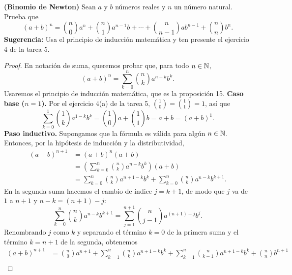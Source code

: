\documentclass[12pt,a4paper]{article}
\begin{document}
    \begin{problema}
        \textbf{(Binomio de Newton)} Sean $a$ y $b$ números reales y $n$ un número natural. Prueba que
        \begin{equation*}
            (a+b)^{n}=\binom{n}{0}a^{n}+\binom{n}{1}a^{n-1}b+\cdots+\binom{n}{n-1}ab^{n-1}+\binom{n}{n}b^{n}.
        \end{equation*}
        \textbf{Sugerencia:} Usa el principio de inducción matemática y ten presente el ejercicio 4 de la tarea 5.
    \end{problema}

    \begin{proof}
        En notación de suma, queremos probar que, para todo $n\in\mathbb{N}$,
        \begin{equation*}
            (a+b)^{n}=\sum_{k=0}^{n}\binom{n}{k}a^{n-k}b^{k}.
        \end{equation*}
        Usaremos el principio de inducción matemática, que es la proposición 15.
        \textbf{Caso base ($n=1$).} Por el ejercicio 4(a) de la tarea 5, $\binom{1}{0}=\binom{1}{1}=1$, así que
        \begin{equation*}
            \sum_{k=0}^{1}\binom{1}{k}a^{1-k}b^{k}=\binom{1}{0}a+\binom{1}{1}b=a+b=(a+b)^{1}.
        \end{equation*}
        \textbf{Paso inductivo.} Supongamos que la fórmula es válida para algún $n\in\mathbb{N}$. Entonces, por la hipótesis de inducción y la distributividad,
        \begin{align*}
            (a+b)^{n+1}&=(a+b)^{n}(a+b)\\
            &=\left(\sum_{k=0}^{n}\binom{n}{k}a^{n-k}b^{k}\right)(a+b)\\
            &=\sum_{k=0}^{n}\binom{n}{k}a^{n+1-k}b^{k}+\sum_{k=0}^{n}\binom{n}{k}a^{n-k}b^{k+1}.
        \end{align*}
        En la segunda suma hacemos el cambio de índice $j=k+1$, de modo que $j$ va de $1$ a $n+1$ y $n-k=(n+1)-j$:
        \begin{equation*}
            \sum_{k=0}^{n}\binom{n}{k}a^{n-k}b^{k+1}=\sum_{j=1}^{n+1}\binom{n}{j-1}a^{(n+1)-j}b^{j}.
        \end{equation*}
        Renombrando $j$ como $k$ y separando el término $k=0$ de la primera suma y el término $k=n+1$ de la segunda, obtenemos
        \begin{align*}
            (a+b)^{n+1}&=\binom{n}{0}a^{n+1}+\sum_{k=1}^{n}\binom{n}{k}a^{n+1-k}b^{k}+\sum_{k=1}^{n}\binom{n}{k-1}a^{n+1-k}b^{k}+\binom{n}{n}b^{n+1}\\

\end{align*}
\end{proof}
\end{document}
